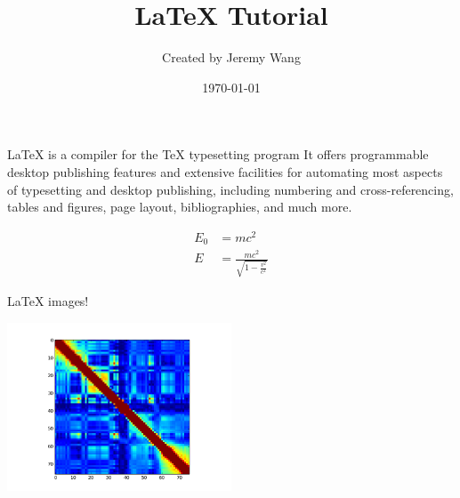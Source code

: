 \documentclass[12pt]{article}
\title{\LaTeX{} Tutorial}
\author{Created by Jeremy Wang}
\date{\today}
\begin{document}
  \maketitle
  \LaTeX{} is a compiler for the \TeX{} typesetting program
  It offers programmable desktop publishing features and extensive facilities for
  automating most aspects of typesetting and desktop
  publishing, including numbering and cross-referencing,
  tables and figures, page layout, bibliographies, and
  much more.
 

  \begin{align}
    E_0 &= mc^2                              \\
    E &= \frac{mc^2}{\sqrt{1-\frac{v^2}{c^2}}}
  \end{align}


  \LaTeX{} images!

  \begin{center}
  \includegraphics[height=5cm, keepaspectratio]{images/fancy_figure.png}
  \end{center}
\end{document}
